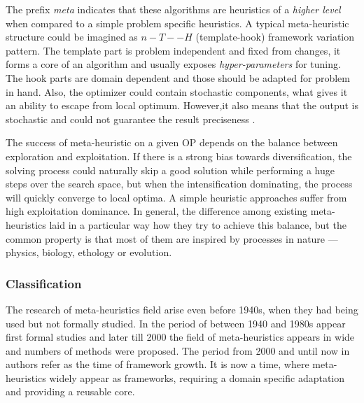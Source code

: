 The prefix \textit{meta} indicates that these algorithms are heuristics of a \textit{higher level} when compared to a simple problem specific heuristics. A typical meta-heuristic structure could be imagined as $n-T--H$ (template-hook) framework variation pattern. The template part is problem independent and fixed from changes, it forms a core of an algorithm and usually exposes \textit{hyper-parameters} for tuning. The hook parts are domain dependent and those should be adapted for problem in hand.
Also, the optimizer could contain stochastic components, what gives it an ability to escape from local optimum. However,it also means that the output is stochastic and could not guarantee the result preciseness \cite{boussaid2013survey}.


The success of meta-heuristic on a given OP depends on the balance between exploration and exploitation. If there is a strong bias towards diversification, the solving process could naturally skip a good solution while performing a huge steps over the search space, but when the intensification dominating, the process will quickly converge to local optima. A simple heuristic approaches suffer from high exploitation dominance. 
In general, the difference among existing meta-heuristics laid in a particular way how they try to achieve this balance, but the common property is that most of them are inspired by processes in nature — physics, biology, ethology or evolution.


\subsubsection{Classification}
The research of meta-heuristics field arise even before 1940s, when they had being used but not formally studied. In the period of between 1940 and 1980s appear first formal studies and later till 2000 the field of meta-heuristics appears in wide and numbers of methods were proposed. The period from 2000 and until now in \cite{sorensen2017history} authors refer as the time of framework growth. It is now a time, where meta-heuristics widely appear as frameworks, requiring a domain specific adaptation and providing a reusable core. 

